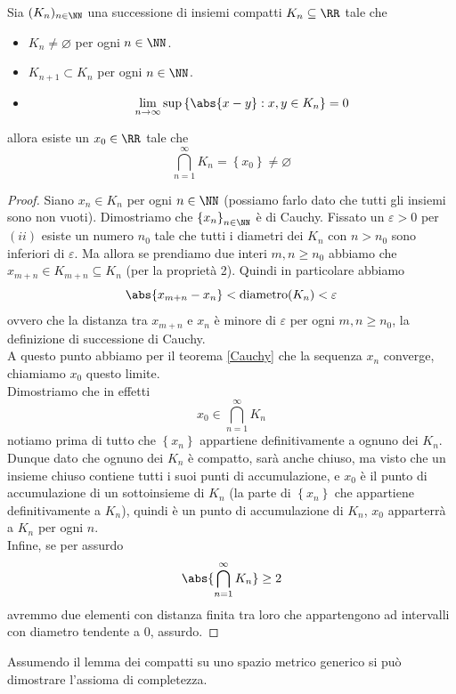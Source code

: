 \documentclass[11pt]{scrartcl}
\newcommand{\eset}{\varnothing}
\begin{document}
 	\begin{theorem}
 		Sia $(K_n)_{n\in\NN}$ una successione di insiemi compatti $K_n\subseteq\RR$ tale che
 		\begin{itemize}
 			\item[i)] $K_n\ne \eset$ per ogni $n\in\NN$.
 			\item[ii)] $K_{n+1}\subset K_n$ per ogni $n\in\NN$.
 			\item[iii)] $$\lim_{n\to\infty}\sup\left\{\abs{x-y}:x,y\in K_n\right\}=0$$
 		\end{itemize}
 		allora esiste un $x_0\in\RR$ tale che 
 		$$\bigcap_{n=1}^\infty K_n=\left\{x_0\right\}\ne\eset$$
 	\end{theorem}
 	\begin{proof}
 		Siano $x_n\in K_n$ per ogni $n\in\NN$ (possiamo farlo dato che tutti gli insiemi sono non vuoti). Dimostriamo che $\left\{x_n\right\}_{n\in\NN}$ è di Cauchy. Fissato un $\varepsilon>0$ per $(ii)$ esiste un numero $n_0$ tale che tutti i diametri dei $K_n$ con $n>n_0$ sono inferiori di $\varepsilon$. Ma allora se prendiamo due interi $m,n\ge n_0$ abbiamo che $x_{m+n}\in K_{m+n}\subseteq K_n$ (per la proprietà 2). Quindi in particolare abbiamo
 		$$\abs{x_{m+n}-x_n}<\text{diametro}(K_n)<\varepsilon$$
 		ovvero che la distanza tra $x_{m+n}$ e $x_n$ è minore di $\varepsilon$ per ogni $m,n\ge n_0$, la definizione di successione di Cauchy. \\
 		A questo punto abbiamo per il teorema \ref{Cauchy} che la sequenza $x_n$ converge, chiamiamo $x_0$ questo limite. \\
 		Dimostriamo che in effetti
 		$$x_0\in\bigcap_{n=1}^\infty K_n$$ 
 		notiamo prima di tutto che $\left\{x_n\right\}$ appartiene definitivamente a ognuno dei $K_n$. Dunque dato che ognuno dei $K_n$ è compatto, sarà anche chiuso, ma visto che un insieme chiuso contiene tutti i suoi punti di accumulazione, e $x_0$ è il punto di accumulazione di un sottoinsieme di $K_n$ (la parte di $\left\{x_n\right\}$ che appartiene definitivamente a $K_n$), quindi è un punto di accumulazione di $K_n$, $x_0$ apparterrà a $K_n$ per ogni $n$. \\
 		Infine, se per assurdo 
 		$$\abs{\bigcap_{n=1}^\infty K_n}\ge 2$$
 		avremmo due elementi con distanza finita tra loro che appartengono ad intervalli con diametro tendente a $0$, assurdo.
 	\end{proof}
 	\begin{theorem}
 		Assumendo il lemma dei compatti su uno spazio metrico generico si può dimostrare l'assioma di completezza.
 	\end{theorem}
\end{document}
